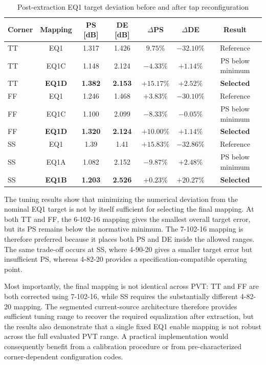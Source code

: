 \begin{table}[htbp]
    \centering
    \caption{Post-extraction EQ1 target deviation before and after tap reconfiguration}
    \label{tab:eq1_tuning_comparison}
    \begin{tabular}{lcccccc}
        \hline \hline
		\textbf{Corner} & \textbf{Mapping} & \textbf{PS [dB]} & \textbf{DE [dB]} & \textbf{$\Delta$PS} & \textbf{$\Delta$DE} & \textbf{Result} \\
		\hline

	TT & EQ1 & 1.317 & 1.426 & $9.75\%$ & $-32.10\%$ & Reference \\
	TT & EQ1C & 1.148 & 2.124 & $-4.33\%$ & $+1.14\%$ &
	PS below minimum \\
	TT & \textbf{EQ1D} & \textbf{1.382} & \textbf{2.153} &
	\textbf{$+15.17\%$} & \textbf{$+2.52\%$} & \textbf{Selected} \\
	\hline

	FF & EQ1 & 1.246 & 1.468 & $+3.83\%$ & $-30.10\%$ & Reference \\
	FF & EQ1C & 1.100 & 2.099 & $-8.33\%$ & $-0.05\%$ &
	PS below minimum \\
	FF & \textbf{EQ1D} & \textbf{1.320} & \textbf{2.124} &
	\textbf{$+10.00\%$} & \textbf{$+1.14\%$} & \textbf{Selected} \\
	\hline

	SS & EQ1 & 1.39 & 1.41 & $+15.83\%$ & $-32.86\%$ & Reference \\
	SS & EQ1A & 1.082 & 2.152 & $-9.87\%$ & $+2.48\%$ &
	PS below minimum \\
	SS & \textbf{EQ1B} & \textbf{1.203} & \textbf{2.526} &
	\textbf{$+0.23\%$} & \textbf{$+20.27\%$} & \textbf{Selected} \\

	\hline \hline
	\end{tabular}
\end{table}

The tuning results show that minimizing the numerical deviation from the nominal EQ1 target is not by itself sufficient for selecting the final mapping. At both \ac{TT} and \ac{FF}, the 6-102-16 mapping gives the smallest overall target error, but its \ac{PS} remains below the normative minimum. The 7-102-16 mapping is therefore preferred because it places both \ac{PS} and \ac{DE} inside the allowed ranges. The same trade-off occurs at \ac{SS}, where 4-90-20 gives a smaller target error but insufficient \ac{PS}, whereas 4-82-20 provides a specification-compatible operating point.

Most importantly, the final mapping is not identical across \ac{PVT}: \ac{TT} and \ac{FF} are both corrected using 7-102-16, while \ac{SS} requires the substantially different 4-82-20 mapping. The segmented current-source architecture therefore provides sufficient tuning range to recover the required equalization after extraction, but the results also demonstrate that a single fixed EQ1 enable mapping is not robust across the full evaluated \ac{PVT} range. A practical implementation would consequently benefit from a calibration procedure or from pre-characterized corner-dependent configuration codes.

